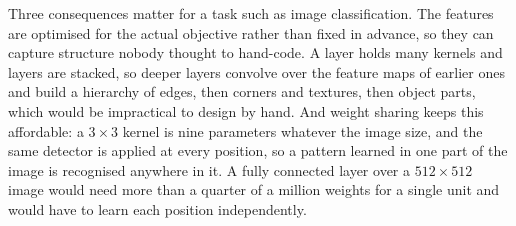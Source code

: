 \documentclass[11pt,a4paper]{article}
\begin{document}
Three consequences matter for a task such as image classification. The features are
optimised for the actual objective rather than fixed in advance, so they can capture
structure nobody thought to hand-code. A layer holds many kernels and layers are
stacked, so deeper layers convolve over the feature maps of earlier ones and build a
hierarchy of edges, then corners and textures, then object parts, which would be
impractical to design by hand. And weight sharing keeps this affordable: a $3\times3$
kernel is nine parameters whatever the image size, and the same detector is applied at
every position, so a pattern learned in one part of the image is recognised anywhere
in it. A fully connected layer over a $512\times512$ image would need more than a
quarter of a million weights for a single unit and would have to learn each position
independently.
\end{document}
